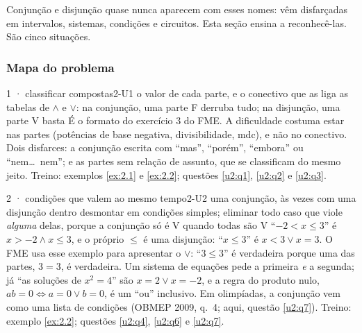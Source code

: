 Conjunção e disjunção quase nunca aparecem com esses nomes: vêm disfarçadas em intervalos, sistemas, condições e circuitos. Esta seção ensina a reconhecê-las. São cinco situações.

\subsubsection{Mapa do problema}

\begin{caso}{1 · classificar compostas}{2-U1}
{o valor de cada parte, e o conectivo que as liga}
{as tabelas de $\wedge$ e $\vee$: na conjunção, uma parte F derruba tudo; na disjunção, uma parte V basta}
\reconhecer É o formato do exercício 3 do FME. A dificuldade costuma estar nas partes (potências de base negativa, divisibilidade, mdc), e não no conectivo. Dois disfarces: a conjunção escrita com \enquote{mas}, \enquote{porém}, \enquote{embora} ou \enquote{nem\ldots\ nem}; e as partes sem relação de assunto, que se classificam do mesmo jeito. Treino: exemplos \ref{ex:2.1} e \ref{ex:2.2}; questões \ref{u2:q1}, \ref{u2:q2} e \ref{u2:q3}.
\end{caso}

\begin{caso}{2 · condições que valem ao mesmo tempo}{2-U2}
{uma conjunção, às vezes com uma disjunção dentro}
{desmontar em condições simples; eliminar todo caso que viole \emph{alguma} delas, porque a conjunção só é V quando todas são V}
\reconhecer \enquote{$-2<x\le3$} é $x>-2\wedge x\le3$, e o próprio $\le$ é uma disjunção: \enquote{$x\le3$} é $x<3\vee x=3$. O FME usa esse exemplo para apresentar o $\vee$: \enquote{$3\le3$} é verdadeira porque uma das partes, $3=3$, é verdadeira. Um sistema de equações pede a primeira \emph{e} a segunda; já \enquote{as soluções de $x^2=4$} são $x=2\vee x=-2$, e a regra do produto nulo, $ab=0 \iff a=0\vee b=0$, é um \enquote{ou} inclusivo. Em olimpíadas, a conjunção vem como uma lista de condições (OBMEP 2009, q.~4; aqui, questão \ref{u2:q7}). Treino: exemplo \ref{ex:2.2}; questões \ref{u2:q4}, \ref{u2:q6} e \ref{u2:q7}.
\end{caso}

